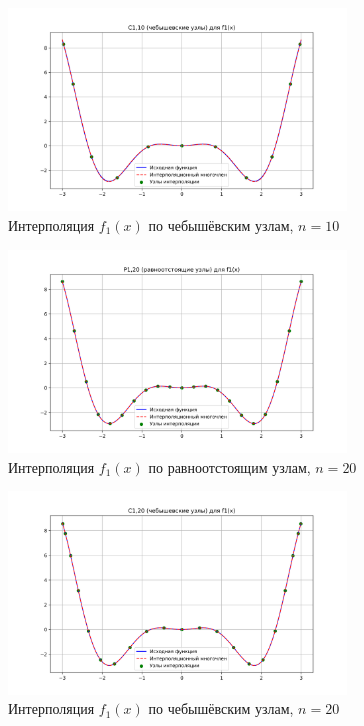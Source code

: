 \documentclass[12pt]{article}
\begin{document}
\begin{figure}[H]
    \centering
    \includegraphics[width=0.8\textwidth]{C1_10.png}
    \caption{Интерполяция $f_1(x)$ по чебышёвским узлам, $n=10$}
\end{figure}

\begin{figure}[H]
    \centering
    \includegraphics[width=0.8\textwidth]{P1_20.png}
    \caption{Интерполяция $f_1(x)$ по равноотстоящим узлам, $n=20$}
\end{figure}

\begin{figure}[H]
    \centering
    \includegraphics[width=0.8\textwidth]{C1_20.png}
    \caption{Интерполяция $f_1(x)$ по чебышёвским узлам, $n=20$}
\end{figure}
\end{document}
